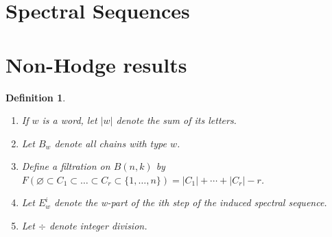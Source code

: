 \documentclass{amsart}
\newtheorem{definition}[theorem]{Definition}
\begin{document}
\section{Spectral Sequences} \label{S:Seq}
\section{Non-Hodge results}\label{S:Non}
  \begin{definition} 
     

     \begin{enumerate}
        \item If $w$ is a word, let $|w|$ denote the sum of its letters.
        \item Let $B_w$ denote all chains with type $w$.
        \item Define a filtration on $B(n, k)$ by $F(\varnothing \subset C_1 \subset \ldots 
           \subset C_r \subset \{1, \ldots, n\}) = |C_1| + \cdots + |C_r| - r$.
        \item Let $E^i_w$ denote the w-part of the ith step of the induced spectral sequence.
        \item Let $\div$ denote integer division.
     \end{enumerate}
  \end{definition}
\end{document}
